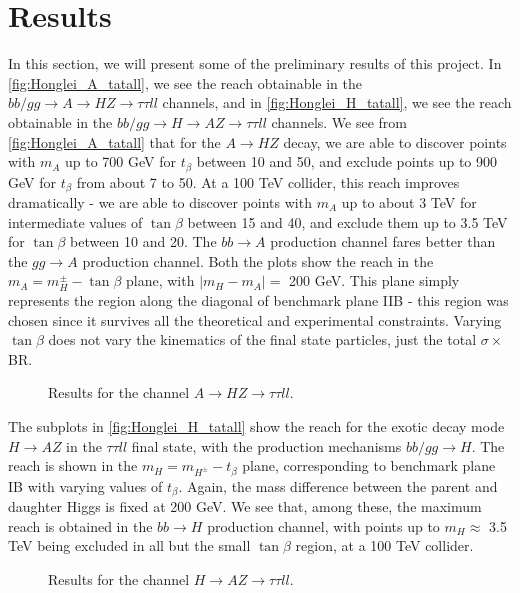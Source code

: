 \section{Results}
In this section, we will present some of the preliminary results of this project. In \autoref{fig:Honglei_A_tatall}, we see the reach obtainable in the $bb/gg\rightarrow A\rightarrow HZ\rightarrow \tau\tau ll$ channels, and in \autoref{fig:Honglei_H_tatall}, we see the reach obtainable in the $bb/gg\rightarrow H\rightarrow AZ\rightarrow \tau\tau ll$ channels. We see from \autoref{fig:Honglei_A_tatall} that for the $A\rightarrow HZ$ decay, we are able to discover points with $m_A$ up to 700 GeV for $t_\beta$ between 10 and 50, and exclude points up to 900 GeV for $t_\beta$ from about 7 to 50. At a 100 TeV collider, this reach improves dramatically - we are able to discover points with $m_A$ up to about 3 TeV for intermediate values of $\tan\beta$ between 15 and 40, and exclude them up to 3.5 TeV for $\tan\beta$ between 10 and 20. The $bb\rightarrow A$ production channel fares better than the $gg\rightarrow A$ production channel. Both the plots show the reach in the $m_A = m_H^{\pm} - \tan\beta$ plane, with $|m_H - m_A| = $ 200 GeV. This plane simply represents the region along the diagonal of benchmark plane IIB - this region was chosen since it survives all the theoretical and experimental constraints. Varying $\tan\beta$ does not vary the kinematics of the final state particles, just the total $\sigma\times$BR. 
\strictpagecheck
\begin{figure}
\centering
\caption{Results for the channel $A\rightarrow HZ\rightarrow \tau\tau ll$.}
\label{fig:Honglei_A_tatall}
\end{figure}
The subplots in \autoref{fig:Honglei_H_tatall} show the reach for the exotic decay mode $H\rightarrow AZ$ in the $\tau\tau ll$ final state, with the production mechanisms $bb/gg\rightarrow H$. The reach is shown in the $m_H = m_{H^\pm}-t_\beta$ plane, corresponding to benchmark plane IB with varying values of $t_\beta$. Again, the mass difference between the parent and daughter Higgs is fixed at 200 GeV. We see that, among these, the maximum reach is obtained in the $bb\rightarrow H$ production channel, with points up to $m_H\approx$ 3.5 TeV being excluded in all but the small $\tan\beta$ region, at a 100 TeV collider.
\strictpagecheck
\begin{figure}
\caption{Results for the channel $H\rightarrow AZ\rightarrow \tau\tau ll$.}
\label{fig:Honglei_H_tatall}
\end{figure}
